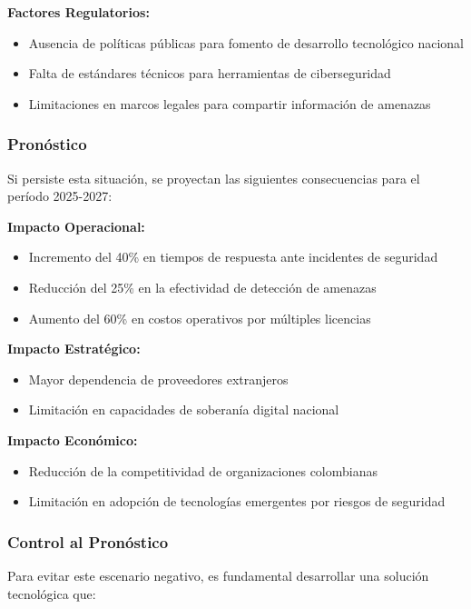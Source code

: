 \textbf{Factores Regulatorios:}
\begin{itemize}
    \item Ausencia de políticas públicas para fomento de desarrollo tecnológico nacional
    \item Falta de estándares técnicos para herramientas de ciberseguridad
    \item Limitaciones en marcos legales para compartir información de amenazas
\end{itemize}

\subsubsection{Pronóstico}
Si persiste esta situación, se proyectan las siguientes consecuencias para el período 2025-2027:

\textbf{Impacto Operacional:}
\begin{itemize}
    \item Incremento del 40\% en tiempos de respuesta ante incidentes de seguridad
    \item Reducción del 25\% en la efectividad de detección de amenazas
    \item Aumento del 60\% en costos operativos por múltiples licencias
\end{itemize}

\textbf{Impacto Estratégico:}
\begin{itemize}
    \item Mayor dependencia de proveedores extranjeros
    \item Limitación en capacidades de soberanía digital nacional
\end{itemize}

\textbf{Impacto Económico:}
\begin{itemize}
    \item Reducción de la competitividad de organizaciones colombianas
    \item Limitación en adopción de tecnologías emergentes por riesgos de seguridad
\end{itemize}

\subsubsection{Control al Pronóstico}
Para evitar este escenario negativo, es fundamental desarrollar una solución tecnológica que:

